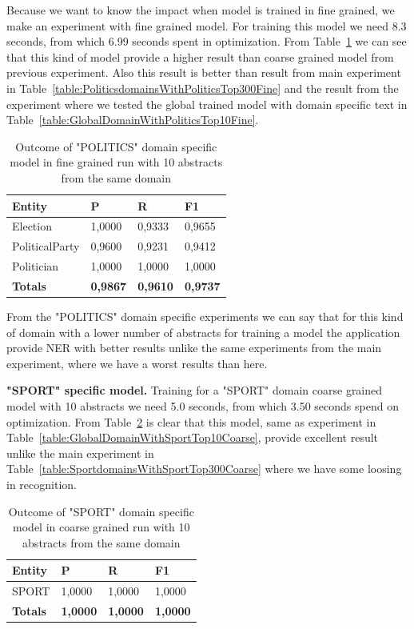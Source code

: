\documentclass[thesis=M,english]{FITthesis}[2018/05/30]
\begin{document}
	Because we want to know the impact when model is trained in fine grained, we make an experiment with fine grained model. For training this model we need 8.3 seconds, from which 6.99 seconds spent in optimization. From Table~\ref{table:PoliticsDomainWithPoliticsTop10Fine} we can see that this kind of model provide a higher result than coarse grained model from previous experiment. Also this result is better than result from main experiment in Table~\ref{table:PoliticsdomainsWithPoliticsTop300Fine} and the result from the experiment where we tested the global trained model with domain specific text in Table~\ref{table:GlobalDomainWithPoliticsTop10Fine}.
	
	\begin{table}[H]\centering
		\begin{tabular}{|l|l|l|l|}
			\hline {\textbf{Entity}} & {\textbf{P}} & {\textbf{R}} & {\textbf{F1}}\\\hline
				Election & 1,0000 & 0,9333 & 0,9655\\
				PoliticalParty & 0,9600 & 0,9231 & 0,9412\\
				Politician & 1,0000 & 1,0000 & 1,0000\\\hline
				\textbf{Totals} & \textbf{0,9867} & \textbf{0,9610} & \textbf{0,9737}\\\hline
		\end{tabular}
		\caption{Outcome of "POLITICS" domain specific model in fine grained run with 10 abstracts from the same domain \label{table:PoliticsDomainWithPoliticsTop10Fine}}		
	\end{table}	

	From the "POLITICS" domain specific experiments we can say that for this kind of domain with a lower number of abstracts for training a model the application provide NER with better results unlike the same experiments from the main experiment, where we have a worst results than here.
		
	
	\textbf{"SPORT" specific model.} Training for a "SPORT" domain coarse grained model with 10 abstracts we need 5.0 seconds, from which 3.50 seconds spend on optimization. From Table~\ref{table:SportDomainWithSportTop10Coarse} is clear that this model, same as experiment in Table~\ref{table:GlobalDomainWithSportTop10Coarse}, provide excellent result unlike the main experiment in Table~\ref{table:SportdomainsWithSportTop300Coarse} where we have some loosing in recognition. 
	
	\begin{table}[H]\centering
		\begin{tabular}{|l|l|l|l|}
			\hline {\textbf{Entity}} & {\textbf{P}} & {\textbf{R}} & {\textbf{F1}}\\\hline
				SPORT & 1,0000 & 1,0000 & 1,0000\\\hline
				\textbf{Totals} & \textbf{1,0000} & \textbf{1,0000} & \textbf{1,0000}\\\hline
		\end{tabular}
		\caption{Outcome of "SPORT" domain specific model in coarse grained run with 10 abstracts from the same domain \label{table:SportDomainWithSportTop10Coarse}}
	\end{table}	
\end{document}

